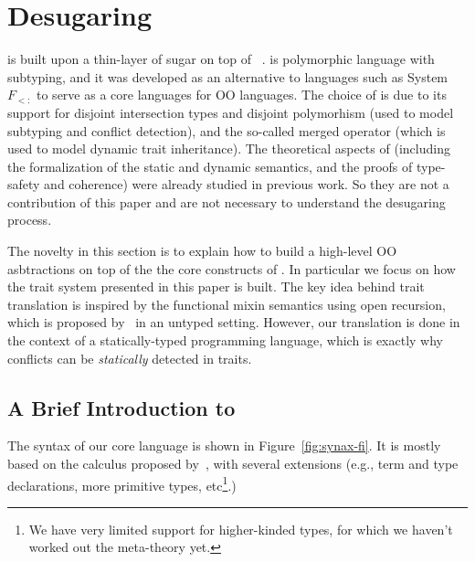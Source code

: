 \section{Desugaring}
\label{sec:desugar}

\name is built upon a thin-layer of sugar on top of \bname~\cite{}.
\bname is polymorphic language with subtyping, and it was developed as
an alternative to languages such as System $F_{<:}$ to serve as a core
languages for OO languages. The choice of \bname is due to its
support for disjoint intersection types and disjoint polymorhism (used
to model subtyping and conflict detection), and the so-called merged
operator (which is used to model dynamic trait inheritance).  The theoretical
aspects of \bname (including the formalization of the static and
dynamic semantics, and the proofs of type-safety and coherence) were
already studied in previous work. So they are not a contribution of
this paper and are not necessary to understand the desugaring process.

The novelty in this section is to explain how to build a high-level OO asbtractions
on top of the the core constructs of \bname. In particular we focus on
how the trait system presented in this paper is built. The key idea behind trait translation is
inspired by the functional mixin semantics using open recursion, which is
proposed by~\citet{cook1989denotational} in an untyped setting. However, our
translation is done in the context of a statically-typed programming language,
which is exactly why conflicts can be \textit{statically} detected in traits.

\subsection{A Brief Introduction to \bname}
The syntax of our core language \bname is shown in Figure~\ref{fig:synax-fi}. It
is mostly based on the calculus proposed by~\citet{alpuimdisjoint}, with several
extensions (e.g., term and type declarations, more primitive types,
etc\footnote{We have very limited support for higher-kinded types, for which we
  haven't worked out the meta-theory yet.}.)

